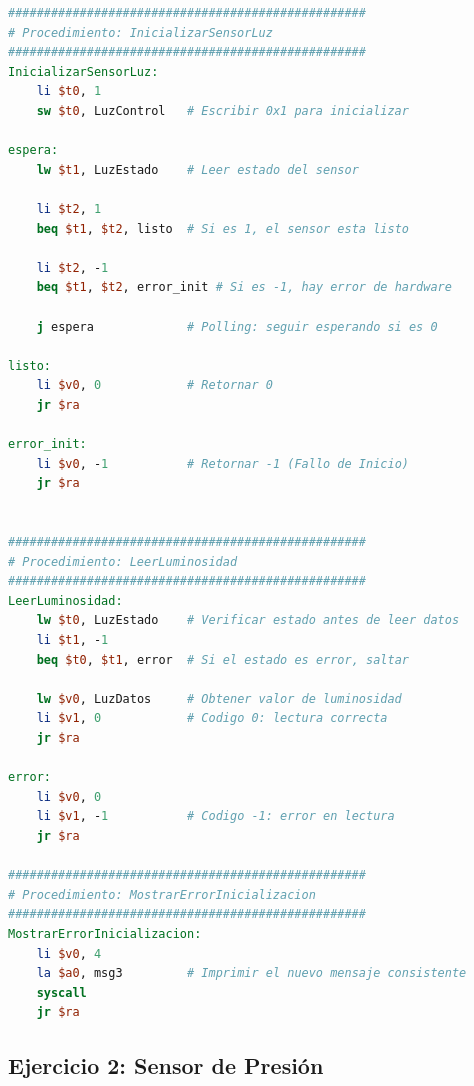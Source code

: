 \documentclass[12pt,a4paper]{article}
\begin{document}
\begin{lstlisting}[language=mips]
##################################################
# Procedimiento: InicializarSensorLuz
##################################################
InicializarSensorLuz:
    li $t0, 1
    sw $t0, LuzControl   # Escribir 0x1 para inicializar

espera:
    lw $t1, LuzEstado    # Leer estado del sensor
    
    li $t2, 1
    beq $t1, $t2, listo  # Si es 1, el sensor esta listo
    
    li $t2, -1
    beq $t1, $t2, error_init # Si es -1, hay error de hardware
    
    j espera             # Polling: seguir esperando si es 0

listo:
    li $v0, 0            # Retornar 0
    jr $ra

error_init:
    li $v0, -1           # Retornar -1 (Fallo de Inicio)
    jr $ra


##################################################
# Procedimiento: LeerLuminosidad
##################################################
LeerLuminosidad:
    lw $t0, LuzEstado    # Verificar estado antes de leer datos
    li $t1, -1
    beq $t0, $t1, error  # Si el estado es error, saltar

    lw $v0, LuzDatos     # Obtener valor de luminosidad
    li $v1, 0            # Codigo 0: lectura correcta
    jr $ra

error:
    li $v0, 0
    li $v1, -1           # Codigo -1: error en lectura
    jr $ra

##################################################
# Procedimiento: MostrarErrorInicializacion
##################################################
MostrarErrorInicializacion:
    li $v0, 4
    la $a0, msg3         # Imprimir el nuevo mensaje consistente
    syscall
    jr $ra
\end{lstlisting}

\subsection{Ejercicio 2: Sensor de Presión}
\end{document}
